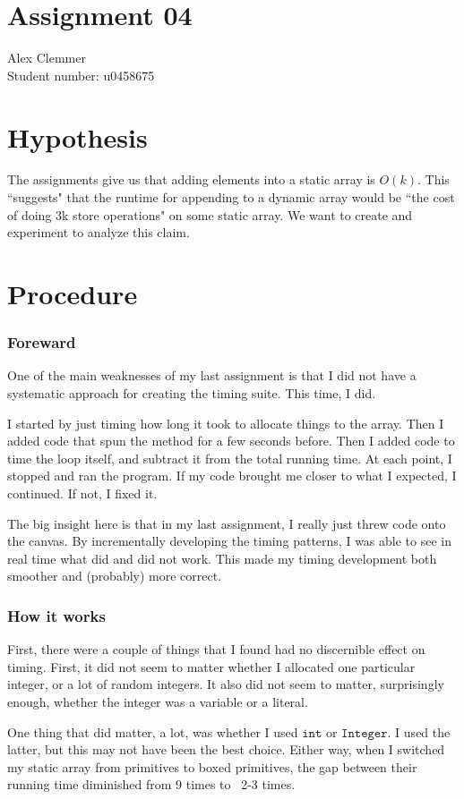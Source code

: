 \documentclass[a4paper]{article}
\begin{document}
\section*{Assignment 04}
Alex Clemmer\\
Student number: u0458675

\section*{Hypothesis}

The assignments give us that adding elements into a static array is $O(k)$. This ``suggests" that the runtime for appending to a dynamic array would be ``the cost of doing 3k store operations" on some static array. We want to create and experiment to analyze this claim.

\section*{Procedure}

\subsubsection*{Foreward} One of the main weaknesses of my last assignment is that I did not have a systematic approach for creating the timing suite. This time, I did.

I started by just timing how long it took to allocate things to the array. Then I added code that spun the method for a few seconds before. Then I added code to time the loop itself, and subtract it from the total running time. At each point, I stopped and ran the program. If my code brought me closer to what I expected, I continued. If not, I fixed it.

The big insight here is that in my last assignment, I really just threw code onto the canvas. By incrementally developing the timing patterns, I was able to see in real time what did and did not work. This made my timing development both smoother and (probably) more correct.

\subsubsection*{How it works}

First, there were a couple of things that I found had no discernible effect on timing. First, it did not seem to matter whether I allocated one particular integer, or a lot of random integers. It also did not seem to matter, surprisingly enough, whether the integer was a variable or a literal.

One thing that did matter, a lot, was whether I used $\texttt{int}$ or $\texttt{Integer}$. I used the latter, but this may not have been the best choice. Either way, when I switched my static array from primitives to boxed primitives, the gap between their running time diminished from 9 times to ~2-3 times.
\end{document}

